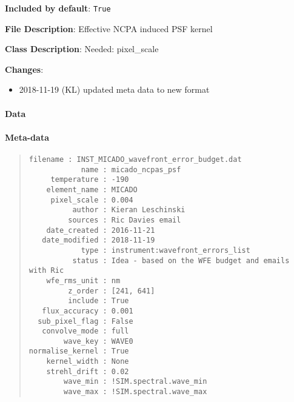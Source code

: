 \textbf{Included by default}: \texttt{True}

\textbf{File Description}: Effective NCPA induced PSF kernel

\textbf{Class Description}: Needed: pixel\_scale

\textbf{Changes}:

\begin{itemize}
\item 2018-11-19 (KL) updated meta data to new format
\end{itemize}


\paragraph{Data%
  \label{id3}%
}


\paragraph{Meta-data%
  \label{id4}%
}

\begin{quote}
\begin{alltt}
\begin{lstlisting}[frame=single]
        filename : INST_MICADO_wavefront_error_budget.dat
            name : micado_ncpas_psf
     temperature : -190
    element_name : MICADO
     pixel_scale : 0.004
          author : Kieran Leschinski
         sources : Ric Davies email
    date_created : 2016-11-21
   date_modified : 2018-11-19
            type : instrument:wavefront_errors_list
          status : Idea - based on the WFE budget and emails with Ric
    wfe_rms_unit : nm
         z_order : [241, 641]
         include : True
   flux_accuracy : 0.001
  sub_pixel_flag : False
   convolve_mode : full
        wave_key : WAVE0
normalise_kernel : True
    kernel_width : None
    strehl_drift : 0.02
        wave_min : !SIM.spectral.wave_min
        wave_max : !SIM.spectral.wave_max
\end{lstlisting}
\end{alltt}
\end{quote}
